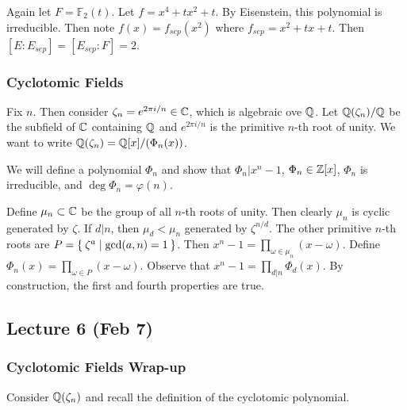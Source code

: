 \documentclass[10pt, twoside]{article}
\newcommand{\F}{\mathbb{F}}
\begin{document}
    \begin{exm}
        Again let $F = \F_2(t)$. Let $f = x^4+tx^2+t$. By Eisenstein, this polynomial is irreducible. Then note $f(x) = f_{sep}(x^2)$ where $f_{sep} = x^2+tx+t$. Then $[E:E_{sep}] = [E_{sep}:F] = 2$.
    \end{exm}

    \subsubsection{Cyclotomic Fields}

    Fix $n$. Then consider $\zeta_n = e^{2\pi i/n} \in \mathbb{C}$, which is algebraic ove $\mathbb{Q}$. Let $\mathbb{Q}(\zeta_n)/\mathbb{Q}$ be the subfield of $\mathbb{C}$ containing $\mathbb{Q}$ and $e^{2\pi i/n}$ is the primitive $n$-th root of unity. We want to write $\mathbb{Q}(\zeta_n) = \mathbb{Q}[x]/(\Phi_n(x))$.

    We will define a polynomial $\Phi_n$ and show that $\Phi_n | x^n-1$, $\Phi_n \in \mathbb{Z}[x]$, $\Phi_n$ is irreducible, and $\deg \Phi_n = \varphi(n)$.

    Define $\mu_n \subset \mathbb{C}$ be the group of all $n$-th roots of unity. Then clearly $\mu_n$ is cyclic generated by $\zeta$. If $d|n$, then $\mu_d < \mu_n$ generated by $\zeta^{n/d}$. The other primitive $n$-th roots are $P = \Set{\zeta^a | \mathrm{gcd}(a,n) = 1}$. Then $x^n-1 = \prod_{\omega \in \mu_n} (x - \omega)$. Define $\Phi_n(x) = \prod_{\omega \in P} (x - \omega)$. Observe that $x^n-1 = \prod_{d|n} \Phi_d(x)$. By construction, the first and fourth properties are true.

    \subsection{Lecture 6 (Feb 7)}
    \subsubsection{Cyclotomic Fields Wrap-up}
    Consider $\mathbb{Q}(\zeta_n)$ and recall the definition of the cyclotomic polynomial.
\end{document}
